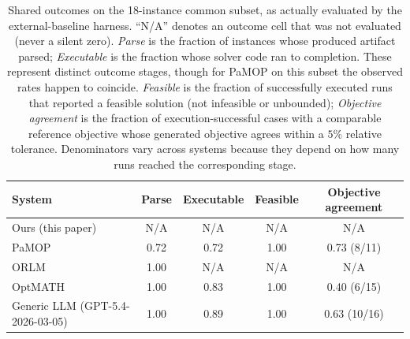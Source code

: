 \documentclass[3p]{elsarticle}
\begin{document}
\begin{table}[t]
  \centering
  \caption{Shared outcomes on the 18-instance common subset, as actually evaluated by the external-baseline harness. ``N/A'' denotes an outcome cell that was not evaluated (never a silent zero). \textit{Parse} is the fraction of instances whose produced artifact parsed; \textit{Executable} is the fraction whose solver code ran to completion. These represent distinct outcome stages, though for PaMOP on this subset the observed rates happen to coincide. \textit{Feasible} is the fraction of successfully executed runs that reported a feasible solution (not infeasible or unbounded); \textit{Objective agreement} is the fraction of execution-successful cases with a comparable reference objective whose generated objective agrees within a $5\%$ relative tolerance. Denominators vary across systems because they depend on how many runs reached the corresponding stage.}
  \label{tab:ext-outcomes}
  \small
  \setlength{\tabcolsep}{4pt}
  \begin{tabular}{lcccc}
    \toprule
    System & Parse & Executable & Feasible & Objective agreement \\
    \midrule
    Ours (this paper) & N/A & N/A & N/A & N/A \\
    PaMOP \cite{pan2025pamop} & 0.72 & 0.72 & 1.00 & 0.73 (8/11) \\
    ORLM \cite{huang2025orlm} & 1.00 & N/A & N/A & N/A \\
    OptMATH \cite{lu2025optmath} & 1.00 & 0.83 & 1.00 & 0.40 (6/15) \\
    Generic LLM (GPT-5.4-2026-03-05) & 1.00 & 0.89 & 1.00 & 0.63 (10/16) \\
    \bottomrule
  \end{tabular}
\end{table}
\end{document}
